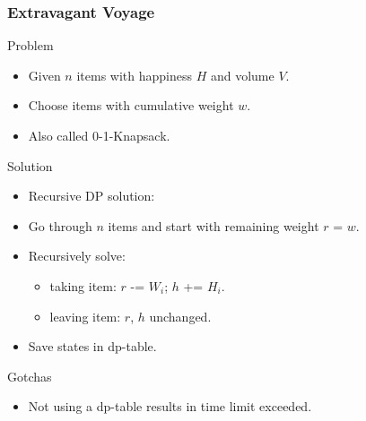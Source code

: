 \documentclass{beamer}
\begin{document}
\begin{frame}
    \frametitle{Extravagant Voyage}
    \begin{block}{Problem}
        \begin{itemize}
            \item Given $n$ items with happiness $H$ and volume $V$.
            \item Choose items with cumulative weight $w$.
            \item Also called 0-1-Knapsack.
        \end{itemize}
    \end{block}
    \begin{block}{Solution}
        \begin{itemize}
            \item Recursive DP solution:
            \item Go through $n$ items and start with remaining weight $r$ = $w$.
            \item Recursively solve:
            \begin{itemize}
                \item taking item: $r$ -= $W_i$; $h$ += $H_i$.
                \item leaving item: $r$, $h$ unchanged.
            \end{itemize}
            \item Save states in dp-table.
        \end{itemize}
    \end{block}
    \begin{block}{Gotchas}
        \begin{itemize}
            \item Not using a dp-table results in time limit exceeded.
        \end{itemize}
    \end{block}
\end{frame}
\end{document}
